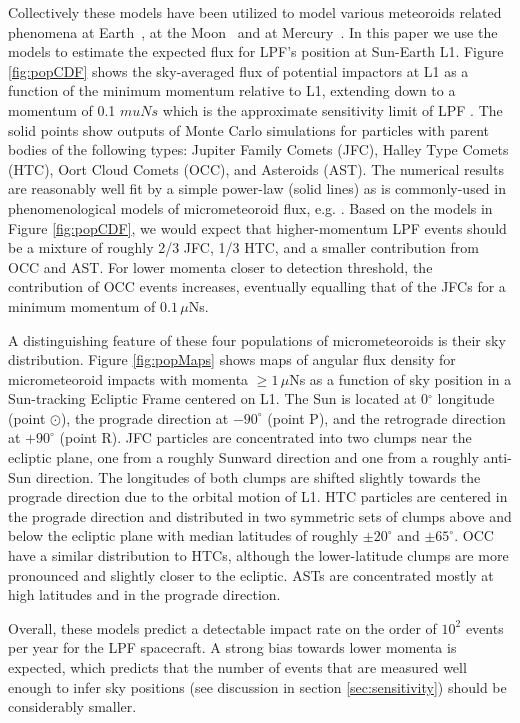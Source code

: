 \documentclass[twocolumn, trackchanges]{aastex62}
\begin{document}
Collectively these models have been utilized to model various meteoroids related phenomena at Earth~\cite[][]{CarrilloSanchez16, Janches17}, at the Moon~\cite{Janches18} and at Mercury~\cite{Pokorny17,Pokorny18}.  In this paper we use the models to estimate the expected flux for LPF's position at Sun-Earth L1. Figure \ref{fig:popCDF} shows the sky-averaged flux of potential impactors at L1 as a function of the minimum momentum relative to L1, extending down to a momentum of 0.1$\,\,mu Ns$ which is the approximate sensitivity limit of LPF \cite{Thorpe:2015cxa}. The solid points show outputs of Monte Carlo simulations for particles with parent bodies of the following types: Jupiter Family Comets (JFC), Halley Type Comets (HTC), Oort Cloud Comets (OCC), and Asteroids (AST).  The numerical results are reasonably well fit by a simple power-law (solid lines) as is commonly-used in phenomenological models of micrometeoroid flux, e.g. \cite{Grun1985}. Based on the models in Figure \ref{fig:popCDF}, we would expect that higher-momentum LPF events should be a mixture of roughly 2/3 JFC, 1/3 HTC, and a smaller contribution from OCC and AST.  For lower momenta closer to detection threshold, the contribution of OCC events increases, eventually equalling that of the JFCs for a minimum momentum of $0.1\,\mu$Ns.  


A distinguishing feature of these four populations of micrometeoroids is their sky distribution.  Figure \ref{fig:popMaps} shows maps of angular flux density for micrometeoroid impacts with momenta $\geq 1\,\mu$Ns as a function of sky position in a Sun-tracking Ecliptic Frame centered on L1.  The Sun is located at 0$^\circ$ longitude (point $\odot$), the prograde direction at $-90^\circ$ (point P), and the retrograde direction at $+90^\circ$ (point R).  JFC particles are concentrated into two clumps near the ecliptic plane, one from a roughly Sunward direction and one from a roughly anti-Sun direction. The longitudes of both clumps are shifted slightly towards the prograde direction due to the orbital motion of L1. HTC particles are centered in the prograde direction and distributed in two symmetric sets of clumps above and below the ecliptic plane with median latitudes of roughly $\pm 20^\circ$ and $\pm 65^\circ$.  OCC have a similar distribution to HTCs, although the lower-latitude clumps are more pronounced and slightly closer to the ecliptic. ASTs are concentrated mostly at high latitudes and in the prograde direction. 

Overall, these models predict a detectable impact rate on the order of $10^2$ events per year for the LPF spacecraft.  A strong bias towards lower momenta is expected, which predicts that the number of events that are measured well enough to infer sky positions (see discussion in section \ref{sec:sensitivity}) should be considerably smaller. 
\end{document}
